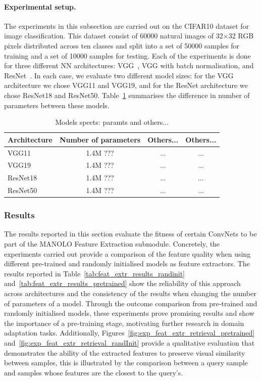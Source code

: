 \paragraph{Experimental setup.} 
The experiments in this subsection are carried out on the CIFAR10 dataset for image classification. This dataset consist of 60000 natural images of 32$\times$32 RGB pixels distributed across ten classes and split into a set of 50000 samples for training and a set of 10000 samples for testing. Each of the experiments is done for three different NN architectures: VGG~\cite{2016_ICLR_VGG}, VGG with batch normalisation, and ResNet~\cite{2016_CVPR_ResNet}. In each case, we evaluate two different model sizes: for the VGG architecture we chose VGG11 and VGG19, and for the ResNet architecture we chose ResNet18 and ResNet50. Table~\ref{tab:NN_specs} summarises the difference in number of parameters between these models.


\begin{table}
    \centering
    \caption{Models spects: paramts and others...}       
    \label{tab:NN_specs}
    \begin{tabular}{lccc}
        \hline 
        {Architecture} & {Number of parameters} & {Others...} & {Others...} \tabularnewline
         \hline
        VGG11 & 1.4M ??? &  ... & ... \tabularnewline
        VGG19 & 1.4M ??? &  ... & ... \tabularnewline
        ResNet18 & 1.4M ??? &  ... & ... \tabularnewline
        ResNet50 & 1.4M ??? &  ... & ... \tabularnewline
        \hline
    \end{tabular} 
\end{table}

\subsubsection{Results}\label{subsubsec:NNfeatExtr_Res}

The results reported in this section evaluate the fitness of certain ConvNets to be part of the MANOLO Feature Extraction submodule. Concretely, the experiments carried out provide a comparison of the feature quality when using different pre-trained and randomly initialised models as feature extractors. The results reported in Table~\ref{tab:feat_extr_results_randinit} and~\ref{tab:feat_extr_results_pretrained} show the reliability of this approach across architectures and the consistency of the results when changing the number of parameters of a model. Through the outcome comparison from pre-trained and randomly initialised models, these experiments prove promising results and show the importance of a pre-training stage, motivating further research in domain adaptation tasks. Additionally, Figures~\ref{fig:exp_feat_extr_retrieval_pretrained} and~\ref{fig:exp_feat_extr_retrieval_randInit} provide a qualitative evaluation that demonstrates the ability of the extracted features to preserve visual similarity between samples, this is illustrated by the comparison between a query sample and samples whose features are the closest to the query's.

